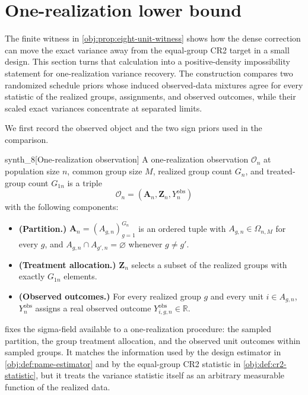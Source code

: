 \section{One-realization lower bound}\label{sec:lower-bound}

The finite witness in \cref{obj:prop:eight-unit-witness} shows how the dense correction can move the exact variance away from the equal-group CR2 target in a small design. This section turns that calculation into a positive-density impossibility statement for one-realization variance recovery. The construction compares two randomized schedule priors whose induced observed-data mixtures agree for every statistic of the realized groups, assignments, and observed outcomes, while their scaled exact variances concentrate at separated limits.

We first record the observed object and the two sign priors used in the comparison.

\begin{definitionv}{synth_8}[One-realization observation]
A one-realization observation \(\mathcal O_n\) at population size \(n\), common group size \(M\), realized group count \(G_n\), and treated-group count \(G_{1n}\) is a triple
\[
\mathcal O_n=(\mathbf A_n,\mathbf Z_n,Y^{\mathrm{obs}}_n)
\]
with the following components:
\begin{itemize}
\item \textbf{(Partition.)} \(\mathbf A_n=(A_{g,n})_{g=1}^{G_n}\) is an ordered tuple with \(A_{g,n}\in\Omega_{n,M}\) for every \(g\), and \(A_{g,n}\cap A_{g',n}=\varnothing\) whenever \(g\ne g'\).
\item \textbf{(Treatment allocation.)} \(\mathbf Z_n\) selects a subset of the realized groups with exactly \(G_{1n}\) elements.
\item \textbf{(Observed outcomes.)} For every realized group \(g\) and every unit \(i\in A_{g,n}\), \(Y^{\mathrm{obs}}_n\) assigns a real observed outcome \(Y^{\mathrm{obs}}_{i,g,n}\in\mathbb R\).
\end{itemize}
\end{definitionv}

 fixes the sigma-field available to a one-realization procedure: the sampled partition, the group treatment allocation, and the observed unit outcomes within sampled groups. It matches the information used by the design estimator in \cref{obj:def:pame-estimator} and by the equal-group CR2 statistic in \cref{obj:def:cr2-statistic}, but it treats the variance statistic itself as an arbitrary measurable function of the realized data.

